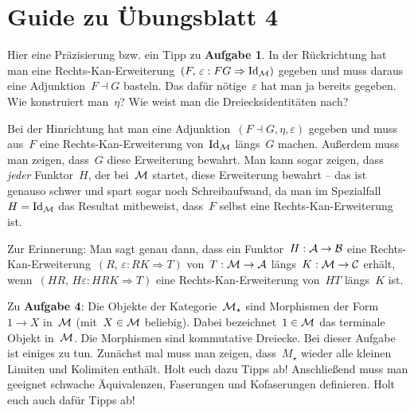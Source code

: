 \documentclass{uebblatt}
\begin{document}
\section*{Guide zu Übungsblatt 4}

Hier eine Präzisierung bzw. ein Tipp zu \textbf{Aufgabe 1}. In der Rückrichtung
hat man eine Rechts-Kan-Erweiterung~$(F,\,\varepsilon : F G \Rightarrow \mathrm{Id}_{\mathcal{M}})$
gegeben und muss daraus eine Adjunktion~$F \dashv G$ basteln. Das dafür
nötige~$\varepsilon$ hat man ja bereits gegeben. Wie konstruiert man~$\eta$?
Wie weist man die Dreiecksidentitäten nach?

Bei der Hinrichtung hat man eine Adjunktion~$(F \dashv G, \eta, \varepsilon)$
gegeben und muss aus~$F$ eine Rechts-Kan-Erweiterung von~$\mathrm{Id}_{\mathcal{M}}$ längs~$G$
machen. Außerdem muss man zeigen, dass~$G$ diese Erweiterung bewahrt. Man kann
sogar zeigen, dass \emph{jeder} Funktor~$H$, der bei~$\mathcal{M}$ startet, diese
Erweiterung bewahrt -- das ist genauso schwer und spart sogar noch
Schreibaufwand, da man im Spezialfall~$H = \mathrm{Id}_{\mathcal{M}}$ das Resultat mitbeweist,
dass~$F$ selbst eine Rechts-Kan-Erweiterung ist.

Zur Erinnerung: Man sagt genau dann, dass ein Funktor~$H : \mathcal{A} \to \mathcal{B}$ eine
Rechts-Kan-Erweiterung~$(R,\,\varepsilon : RK \Rightarrow T)$ von~$T : \mathcal{M} \to
\mathcal{A}$ längs~$K : \mathcal{M} \to \mathcal{C}$ erhält, wenn~$(HR,\,H\varepsilon : HRK \Rightarrow
T)$ eine Rechts-Kan-Erweiterung von~$HT$ längs~$K$ ist.

Zu \textbf{Aufgabe 4}: Die Objekte der Kategorie~$\mathcal{M}_\star$ sind Morphismen der
Form~$1 \to X$ in~$\mathcal{M}$ (mit~$X \in \mathcal{M}$ beliebig). Dabei bezeichnet~$1 \in \mathcal{M}$
das terminale Objekt in~$\mathcal{M}$. Die Morphismen sind kommutative Dreiecke.
Bei dieser Aufgabe ist einiges zu tun. Zunächst mal muss man zeigen,
dass~$M_\star$ wieder alle kleinen Limiten und Kolimiten enthält. Holt euch
dazu Tipps ab! Anschließend muss man geeignet schwache Äquivalenzen, Faserungen
und Kofaserungen definieren. Holt euch auch dafür Tipps ab!
\end{document}
